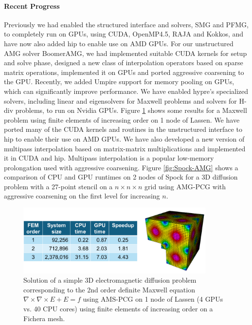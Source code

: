 \paragraph{Recent Progress}

Previously we had enabled the structured interface and solvers, SMG and PFMG\cite{AsFa1996}, to completely run on GPUs, using CUDA, OpenMP4.5, RAJA and Kokkos, and have now also added hip to enable use on AMD GPUs.
For our unstructured AMG solver BoomerAMG, we had implemented suitable CUDA kernels for setup and solve phase, designed a new class of interpolation operators based on sparse matrix operations\cite{LiSY2020}, implemented it on GPUs and ported aggressive coarsening to the GPU. Recently, we added Umpire support for memory pooling on GPUs, which can significantly improve performance. We have enabled hypre's specialized solvers, including linear and eigensolvers for Maxwell problems and solvers for H-div problems, to run on Nvidia GPUs. Figure \ref{fig:AMS-PCG} shows some results for a Maxwell problem using finite elements of increasing order on 1 node of Lassen. We have ported many of the CUDA kernels and routines in the unstructured interface to hip to enable their use on AMD GPUs. We have also developed a new version of multipass interpolation based on matrix-matrix multiplications and implemented it in CUDA and hip. Multipass interpolation is a popular low-memory prolongation used with aggressive coarsening. Figure \ref{fig:Spock-AMG} shows a comparison of CPU and GPU runtimes on 2 nodes of Spock for a 3D diffusion problem with a 27-point stencil on a $n \times n \times n$ grid using AMG-PCG with aggressive coarsening on the first level for increasing $n$.

\begin{figure}[bth]
\centering
	\includegraphics[width=3.9in]{projects/2.3.3-MathLibs/2.3.3.12-SUNDIALS-hypre/AMS-PCG.png}
	\caption{\label{fig:AMS-PCG} Solution of a simple 3D electromagnetic diffusion problem corresponding to the 2nd order definite Maxwell equation  $\nabla \times \nabla \times E + E = f$ using AMS-PCG on 1 node of Lassen (4 GPUs vs. 40 CPU cores) using finite elements of increasing order on a Fichera mesh.}

\end{figure}

